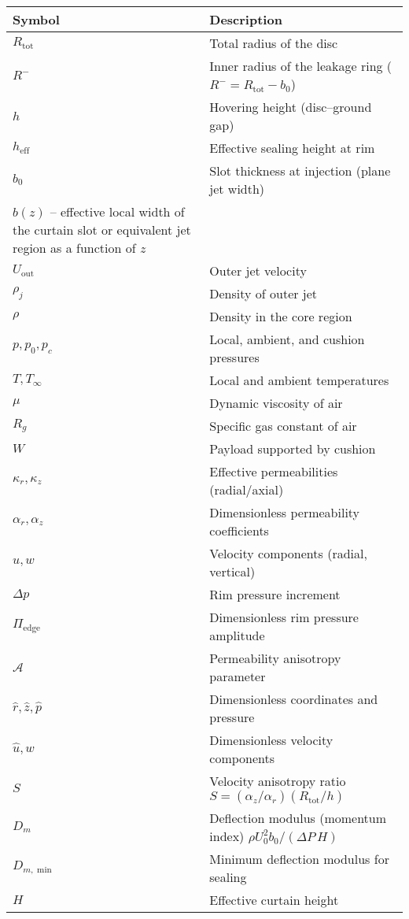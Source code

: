 \documentclass[11pt,a4paper]{article}
\begin{document}
\begin{tabular}{@{}ll@{}}
\toprule
Symbol & Description \\ \midrule
$R_{\mathrm{tot}}$ & Total radius of the disc \\
$R^{-}$ & Inner radius of the leakage ring ($R^{-}=R_{\mathrm{tot}}-b_0$) \\
$h$ & Hovering height (disc--ground gap) \\
$h_{\mathrm{eff}}$ & Effective sealing height at rim \\
$b_0$ & Slot thickness at injection (plane jet width) \\
$b(z)$ -- effective local width of the curtain slot or equivalent jet region as a function of $z$ \\
$U_{\mathrm{out}}$ & Outer jet velocity \\
$\rho_j$ & Density of outer jet \\
$\rho$ & Density in the core region \\
$p,p_0,p_c$ & Local, ambient, and cushion pressures \\
$T,T_\infty$ & Local and ambient temperatures \\
$\mu$ & Dynamic viscosity of air \\
$R_g$ & Specific gas constant of air \\
$W$ & Payload supported by cushion \\
$\kappa_r,\kappa_z$ & Effective permeabilities (radial/axial) \\
$\alpha_r,\alpha_z$ & Dimensionless permeability coefficients \\
$u,w$ & Velocity components (radial, vertical) \\
$\Delta p$ & Rim pressure increment \\
$\Pi_{\mathrm{edge}}$ & Dimensionless rim pressure amplitude \\
$\mathcal{A}$ & Permeability anisotropy parameter \\
$\hat r,\hat z,\hat p$ & Dimensionless coordinates and pressure \\
$\hat u,\hat w$ & Dimensionless velocity components \\
$S$ & Velocity anisotropy ratio $S=(\alpha_z/\alpha_r)(R_{\mathrm{tot}}/h)$ \\ $D_m$ & Deflection modulus (momentum index) $\rho U_0^2 b_0/(\Delta P\,H)$ \\
$D_{m,\min}$ & Minimum deflection modulus for sealing \\
$H$ & Effective curtain height \\

\end{tabular}
\end{document}
